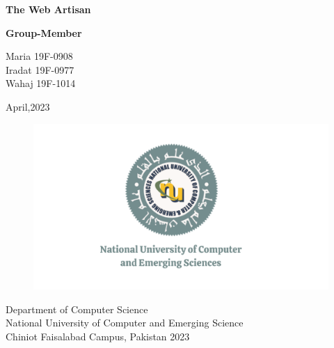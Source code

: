 \begin{Titlepage}
\begin{center}
    \vspace*{2cm}
    
    \textbf{\Huge The Web Artisan}\\
    \vspace*{2cm}
    
       \textbf{ \large Group-Member}
      \vspace{0.2cm}
      \begin{center}
          \large Maria 19F-0908\\Iradat 19F-0977\\Wahaj 19F-1014
      \end{center} 
    
    \vspace{1.5cm}
    \begin{center}
    \large April,2023 
    \end{center}
    
    \vfill
    \vspace{0.8cm}
    \begin{figure}[hb]
        \centering
        \includegraphics[scale=0.20]{Files/Fast-Nuces.png}
    \end{figure}
    Department of Computer Science\\ National University of Computer and Emerging Science\\ Chiniot Faisalabad Campus, Pakistan 2023
    \end{center}
\end{Titlepage}








